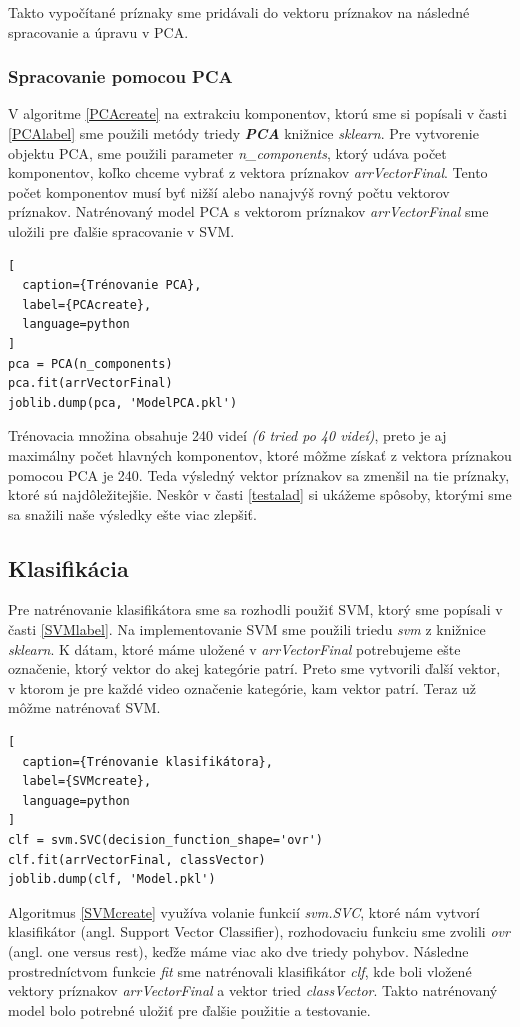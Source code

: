 Takto vypočítané príznaky sme pridávali do vektoru príznakov na následné spracovanie a úpravu v PCA.

\subsubsection{Spracovanie pomocou PCA} \label{PCAim}
V algoritme \ref{PCAcreate} na extrakciu komponentov, ktorú sme si popísali v časti \ref{PCAlabel} sme použili metódy triedy \textit{\textbf{PCA}} knižnice \textit{sklearn}. Pre vytvorenie objektu PCA, sme použili parameter \textit{n\_components}, ktorý udáva počet komponentov, koľko chceme vybrať z vektora príznakov \textit{arrVectorFinal}. Tento počet komponentov musí byť nižší alebo nanajvýš rovný počtu vektorov príznakov. Natrénovaný model PCA s vektorom príznakov \textit{arrVectorFinal} sme uložili pre ďalšie spracovanie v SVM.

\begin{lstlisting}[
  caption={Trénovanie PCA},
  label={PCAcreate},
  language=python
]
pca = PCA(n_components)
pca.fit(arrVectorFinal)
joblib.dump(pca, 'ModelPCA.pkl')   
\end{lstlisting}

Trénovacia množina obsahuje 240 videí \textit{(6 tried po 40 videí)}, preto je aj maximálny počet hlavných komponentov, ktoré môžme získať z vektora príznakou pomocou PCA je 240. Teda výsledný vektor príznakov sa zmenšil na tie príznaky, ktoré sú najdôležitejšie. Neskôr v časti \ref{testalad} si ukážeme spôsoby, ktorými sme sa snažili naše výsledky ešte viac zlepšiť.  


\subsection{Klasifikácia}
Pre natrénovanie klasifikátora sme sa rozhodli použiť SVM, ktorý sme popísali v časti \ref{SVMlabel}. Na implementovanie SVM sme použili triedu \textit{svm} z knižnice \textit{sklearn}. K dátam, ktoré máme uložené v \textit{arrVectorFinal} potrebujeme ešte označenie, ktorý vektor do akej kategórie patrí. Preto sme vytvorili ďalší vektor, v ktorom je pre každé video označenie kategórie, kam vektor patrí. Teraz už môžme natrénovať SVM. 
\hfill \break
\begin{lstlisting}[
  caption={Trénovanie klasifikátora},
  label={SVMcreate},
  language=python
]
clf = svm.SVC(decision_function_shape='ovr')
clf.fit(arrVectorFinal, classVector)
joblib.dump(clf, 'Model.pkl') 
\end{lstlisting}
Algoritmus \ref{SVMcreate} využíva volanie funkcií \textit{svm.SVC}, ktoré nám vytvorí klasifikátor (angl. Support Vector Classifier), rozhodovaciu funkciu sme zvolili \textit{ovr} (angl. one versus rest), keďže máme viac ako dve triedy pohybov. Následne prostredníctvom funkcie \textit{fit} sme natrénovali klasifikátor \textit{clf}, kde boli vložené vektory príznakov \textit{arrVectorFinal} a vektor tried \textit{classVector}. Takto natrénovaný model bolo potrebné uložiť pre ďalšie použitie a testovanie. 

